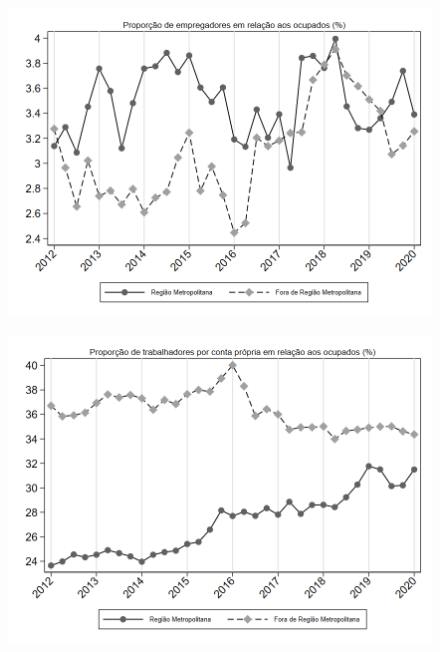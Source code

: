 \begin{frame}[label=_composicao_demografica_regiao_metro_prop_empregador]{}
\textit{\hyperlink{_composicao_demografica_regiao_metro}{}}
\begin{figure}
  \centering
  \includegraphics[width=1.0\linewidth]{../../analysis/output/composicao_demografica/area_geografica/_composicao_demografica_regiao_metro_prop_empregador.png}
  \caption{}
  \label{fig:_composicao_demografica_regiao_metro_prop_empregador}
\end{figure}
\end{frame}



\begin{frame}[label=_composicao_demografica_regiao_metro_prop_cpropria]{}
\textit{\hyperlink{_composicao_demografica_regiao_metro}{}}
\begin{figure}
  \centering
  \includegraphics[width=1.0\linewidth]{../../analysis/output/composicao_demografica/area_geografica/_composicao_demografica_regiao_metro_prop_cpropria.png}
  \caption{}
  \label{fig:_composicao_demografica_regiao_metro_prop_cpropria}
\end{figure}
\end{frame}

